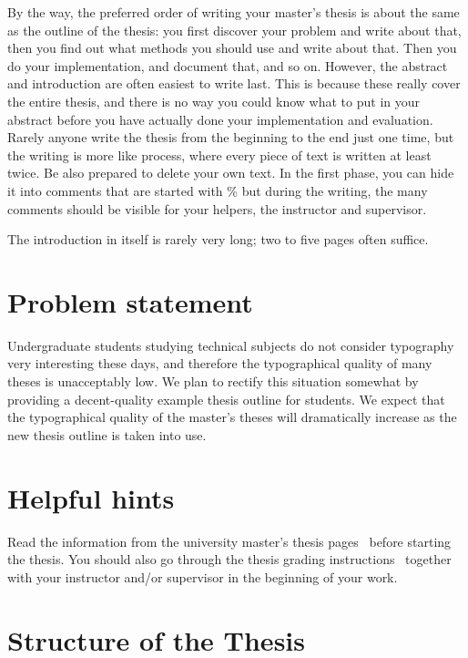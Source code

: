 \documentclass[12pt,a4paper,oneside,pdftex]{report}
\begin{document}
By the way, the preferred order of writing your master's thesis is
about the same as the outline of the thesis: you first discover your
problem and write about that, then you find out what methods you
should use and write about that. Then you do your implementation, and
document that, and so on. However, the abstract and introduction are
often easiest to write last. This is because these really cover the
entire thesis, and there is no way you could know what to put in your
abstract before you have actually done your implementation and
evaluation. Rarely anyone write the thesis from the beginning to the
end just one time, but the writing is more like process, where every
piece of text is written at least twice. Be also prepared to delete
your own text. In the first phase, you can hide it into comments that
are started with \% but during the writing, the many comments should be
visible for your helpers, the instructor and supervisor.

The introduction in itself is rarely very long; two to five pages often
suffice.


\section{Problem statement}

Undergraduate students studying technical subjects do not consider typography
very interesting these days, and therefore the typographical quality of many
theses is unacceptably low.
We plan to rectify this situation somewhat by providing a decent-quality
example thesis outline for students.
We expect that the typographical quality of the master's theses will
dramatically increase as the new thesis outline is taken into use.

\section{Helpful hints}

Read the information from the university master's thesis
pages~\cite{ThesisInstructions} before starting the thesis. You
should also go through the thesis grading
instructions~\cite{ThesisGrading} together with your instructor and/or
supervisor in the beginning of your work.

\section{Structure of the Thesis}
\label{section:structure}
\end{document}
